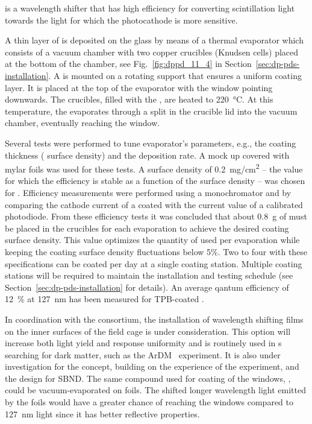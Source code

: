  is a wavelength shifter that has high efficiency for converting \lar scintillation  light towards the light for which the  photocathode is more sensitive. 

A thin layer of  is deposited on the  glass by means of a thermal evaporator which consists of a vacuum chamber with two copper crucibles (Knudsen cells) placed at the bottom of the chamber, see Fig.~\ref{fig:dppd_11_4} in Section~\ref{sec:dp-pds-installation}. A  is mounted on a rotating support that ensures a uniform coating layer. It is placed at the top of the evaporator with the   window pointing downwards. The crucibles, filled with the , are heated to \SI{220}{\degreeCelsius}. At this temperature, the  evaporates through a split in the crucible lid into the vacuum chamber, eventually reaching the  window.

Several tests were performed to tune evaporator's parameters, e.g., the coating thickness ( surface density) and the deposition rate. A  mock up covered with mylar foils was used for these tests. A  surface density of \SI{0.2}{mg/cm^2} -- the value for which the  efficiency is stable as a function of the surface density -- was chosen for . Efficiency measurements were performed using a  monochromator and by comparing the cathode current of a coated  with the current value of a calibrated photodiode. From these efficiency tests it was concluded that about \SI{0.8}{g} of  must be placed in the crucibles for each evaporation to achieve the desired  coating surface density. %
This value optimizes the quantity of  used per evaporation while keeping the coating surface density fluctuations below \num{5}$\%$.  
Two to four   with these specifications can be coated per day at a single coating station. 
Multiple coating stations will be required to maintain the installation and testing schedule (see Section~\ref{sec:dp-pds-installation} for details). An average qantum efficiency of \SI{12}{\%} at \SI{127}{\nano\m} has been measured for TPB-coated  \cite{Bonesini:2018ubd}.

In coordination with the  consortium, the installation of wavelength shifting films on the inner surfaces of the field cage is under consideration. This option will increase both light yield and response uniformity and is routinely used in \dual \lartpc{}s searching for dark matter, such as the ArDM~\cite{Boccone:2009zz} experiment. It is also under investigation for the  concept, building on the experience of the \lariat experiment, and the design for SBND. The same  compound used for coating of the  windows, , could be vacuum-evaporated on foils. The shifted longer wavelength light emitted by the foils would have a greater chance of reaching the  windows compared to \SI{127}{nm} light since it has better reflective properties. 
